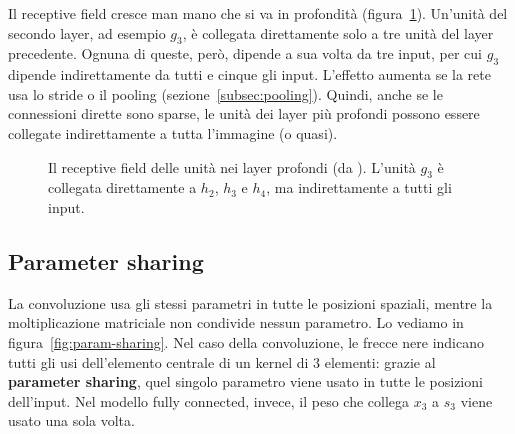 Il receptive field cresce man mano che si va in profondità (figura~\ref{fig:receptive-depth}). Un'unità del secondo layer, ad esempio $g_3$, è collegata direttamente solo a tre unità del layer precedente. Ognuna di queste, però, dipende a sua volta da tre input, per cui $g_3$ dipende indirettamente da tutti e cinque gli input. L'effetto aumenta se la rete usa lo stride o il pooling (sezione~\ref{subsec:pooling}). Quindi, anche se le connessioni dirette sono sparse, le unità dei layer più profondi possono essere collegate indirettamente a tutta l'immagine (o quasi).

\begin{figure}[htbp]
\centering
{}
\caption{Il receptive field delle unità nei layer profondi (da \cite{Goodfellow-et-al-2016}). L'unità $g_3$ è collegata direttamente a $h_2$, $h_3$ e $h_4$, ma indirettamente a tutti gli input.}
\label{fig:receptive-depth}
\end{figure}

\subsection{Parameter sharing}
La convoluzione usa gli stessi parametri in tutte le posizioni spaziali, mentre la moltiplicazione matriciale non condivide nessun parametro. Lo vediamo in figura~\ref{fig:param-sharing}. Nel caso della convoluzione, le frecce nere indicano tutti gli usi dell'elemento centrale di un kernel di 3 elementi: grazie al \textbf{parameter sharing}, quel singolo parametro viene usato in tutte le posizioni dell'input. Nel modello fully connected, invece, il peso che collega $x_3$ a $s_3$ viene usato una sola volta.

